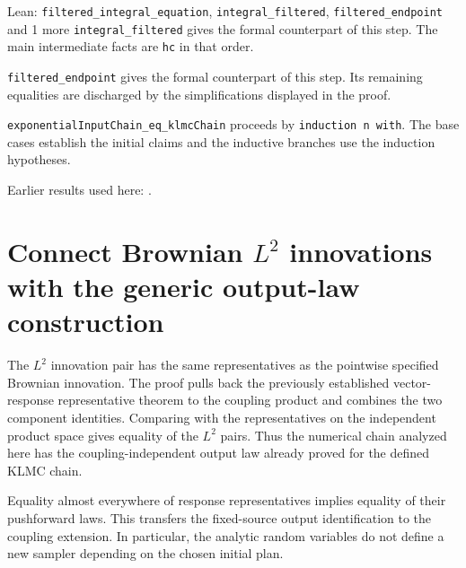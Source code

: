 \documentclass[11pt,a4paper]{article}
\begin{document}
\begin{leanbox}{Lean: \texttt{filtered\_\allowbreak{}integral\_\allowbreak{}equation}, \texttt{integral\_\allowbreak{}filtered}, \texttt{filtered\_\allowbreak{}endpoint} and 1 more}
\texttt{integral\_\allowbreak{}filtered} gives the formal counterpart of this step. The main intermediate facts are \texttt{hc} in that order.




\texttt{filtered\_\allowbreak{}endpoint} gives the formal counterpart of this step. Its remaining equalities are discharged by the simplifications displayed in the proof.




\texttt{exponential\allowbreak{}Input\allowbreak{}Chain\_\allowbreak{}eq\_\allowbreak{}klmc\allowbreak{}Chain} proceeds by \texttt{induction n with}. The base cases establish the initial claims and the inductive branches use the induction hypotheses.
\end{leanbox}


Earlier results used here: \cite[Section~3.17.1]{LangevinLean2026ULASC}.

\section{\texorpdfstring{Connect Brownian \(L^{2}\) innovations with the generic output-law construction}{Connect Brownian L² innovations with the generic output-law construction}}


The \(L^{2}\) innovation pair has the same representatives as the pointwise specified Brownian innovation. The proof pulls back the previously established vector-response representative theorem to the coupling product and combines the two component identities. Comparing with the representatives on the independent product space gives equality of the \(L^{2}\) pairs. Thus the numerical chain analyzed here has the coupling-independent output law already proved for the defined KLMC chain.



Equality almost everywhere of response representatives implies equality of their pushforward laws. This transfers the fixed-source output identification to the coupling extension. In particular, the analytic random variables do not define a new sampler depending on the chosen initial plan.
\end{document}

